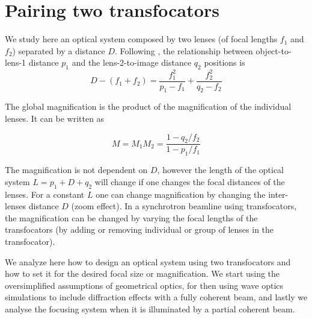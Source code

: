 \documentclass{iucr}              %
\begin{document}
\section{Pairing two transfocators}


We study here an optical system composed by two lenses (of focal lengths $f_1$ and $f_2$) separated by a distance $D$. Following \cite{Goodman85}, the relationship between object-to-lens-1 distance $p_1$ and the lens-2-to-image distance $q_2$ positions is
\begin{equation}
\label{eq:twolens}
    D-(f_1+f_2)=\frac{f_1^2}{p_1-f_1} + \frac{f_2^2}{q_2-f_2}
\end{equation}

The global magnification is the product of the magnification of the individual lenses. It can be written as

\begin{equation}
\label{eq:magnification}
    M=M_1 M_2=\frac{1-q_2/f_2}{1-p_1/f_1}
\end{equation}

The magnification is not dependent on $D$, however the length of the optical system $L=p_1+D+q_2$ will change if one changes the focal distances of the lenses. For a constant $L$ one can change magnification by changing the inter-lenses distance $D$ (zoom effect). In a synchrotron beamline using transfocators, the magnification can be changed by varying the focal lengths of the transfocators (by adding or removing individual or group of lenses in the transfocator).

We analyze here how to design an optical system using two transfocators and how to set it for the desired focal size or magnification. We start using the oversimplified assumptions of geometrical optics, for then using wave optics simulations to include diffraction effects with a fully coherent beam, and lastly we analyse the focusing system when it is illuminated by a partial coherent beam.
\end{document}
